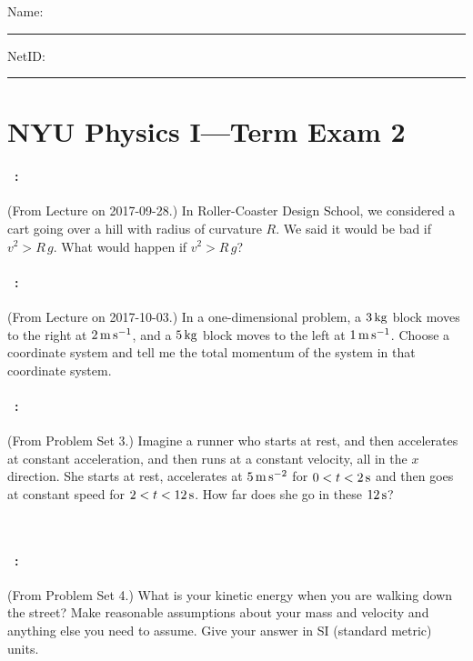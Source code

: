 \documentclass[12pt]{article}
\begin{document}
\noindent
Name: \rule[-1ex]{0.55\textwidth}{0.1pt}
NetID: \rule[-1ex]{0.2\textwidth}{0.1pt}

\section*{NYU Physics I---Term Exam 2}

\paragraph{\problemname~\theproblem:}%
(From Lecture on 2017-09-28.) In Roller-Coaster Design School, we
considered a cart going over a hill with radius of curvature $R$. We
said it would be bad if $v^2 > R\,g$. What would happen if $v^2 > R\,g$?

\vfill

\paragraph{\problemname~\theproblem:}%
(From Lecture on 2017-10-03.) In a one-dimensional problem, a $3\,\mathrm{kg}$
block moves to the right at $2\,\mathrm{m}\,\mathrm{s}^{-1}$, and a $5\,\mathrm{kg}$ block
moves to the left at $1\,\mathrm{m}\,\mathrm{s}^{-1}$.
Choose a coordinate system and tell me the total momentum of the system
in that coordinate system.

\vfill

\paragraph{\problemname~\theproblem:}%
(From Problem Set 3.) Imagine a runner who starts at rest, and then
accelerates at constant acceleration, and then runs at a constant
velocity, all in the $x$ direction.  She starts at rest, accelerates
at $5\,\mathrm{m}\,\mathrm{s}^{-2}$ for $0 < t < 2\,\mathrm{s}$ and then goes at constant
speed for $2 < t < 12\,\mathrm{s}$.  How far does she go in these $12\,\mathrm{s}$?

\vfill
~

\clearpage
\paragraph{\problemname~\theproblem:}%
(From Problem Set 4.) What is your kinetic energy when you are walking
down the street? Make reasonable assumptions about your mass and velocity and
anything else you need to assume. Give your answer in SI (standard metric) units.
\end{document}
